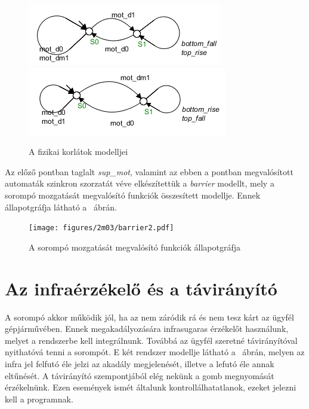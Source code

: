 \begin{figure}
	\centering
	\includegraphics[keepaspectratio]{figures/2m03/b2_constr1.png}	
	\includegraphics[keepaspectratio]{figures/2m03/b2_constr2.png}
	\caption{A fizikai korlátok modelljei}
	\label{fig:Constraints}
\end{figure}

Az előző pontban taglalt \textit{sup\_mot}, valamint az ebben a pontban megvalósított automaták szinkron szorzatát véve elkészítettük a \textit{barrier} modellt, mely a sorompó mozgatását megvalósító funkciók összesített modellje. Ennek állapotgráfja látható a ~ábrán.

\begin{figure}
	\centering
	\texttt{[image: figures/2m03/barrier2.pdf]}
	\caption{A sorompó mozgatását megvalósító funkciók állapotgráfja}
	\label{fig:Barrier}
\end{figure}




\section{Az infraérzékelő és a távirányító}
A sorompó akkor működik jól, ha az nem záródik rá és nem tesz kárt az ügyfél gépjárművében. Ennek megakadályozására infrasugaras érzékelőt használunk, melyet a rendszerbe kell integrálnunk. Továbbá az ügyfél szeretné távirányítóval nyithatóvá tenni a sorompót. E két rendszer modellje látható a ~ábrán, melyen az infra jel felfutó éle jelzi az akadály megjelenését, illetve a lefutó éle annak eltűnését. A távirányító szempontjából elég nekünk a gomb megnyomását érzékelnünk. Ezen események ismét általunk kontrollálhatatlanok, ezeket jelezni kell a programnak. 


